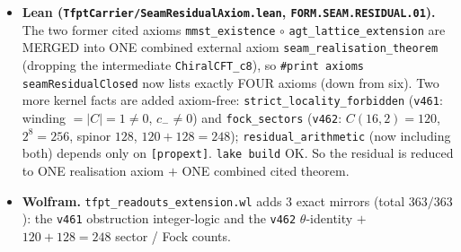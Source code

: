 \begin{itemize}
STATES FILL $120{\to}248$: $\chi_o$ gives $120$, $\chi_s$ gives $128$, summing to the exact tower
$\{1,248,4124,34752\}$ ($248{=}120{+}128$). \mE\ FINITE 16-MAJORANA FOCK: $C(16,2){=}120$ NS bilinear currents and
$2^{16/2}{=}256$ Ramond ground states $={}128$ spinor $+$ $128$ cospinor. \mE\ FINITE-$L\to$ CONTINUUM CONVERGENCE:
the critical free-fermion ring Casimir gives $c_-{\to}8$ and the lowest scaled NS gap $x_1{\to}1$ with
$|x_1{-}1|{\sim}1/L^2$ ($L{=}64..1024$). \mC\mO\ AGT/AMT (\texttt{v459}) supply the rigorous extension;
\texttt{SEAM.EQUIV.01} existence (\texttt{v336}) stays \mO. Mixed exact ($\theta$ identity $+$ tower $+$
$120/128/256$, Wolfram-mirrored) $+$ numerical (finite-$L$, Python-only).
\item \textbf{Lean (\texttt{TfptCarrier/SeamResidualAxiom.lean}, \texttt{FORM.SEAM.RESIDUAL.01}).} The two former
cited axioms \texttt{mmst\_existence} $\circ$ \texttt{agt\_lattice\_extension} are MERGED into ONE combined external
axiom \texttt{seam\_realisation\_theorem} (dropping the intermediate \texttt{ChiralCFT\_c8}), so
\texttt{\#print axioms seamResidualClosed} now lists exactly FOUR axioms (down from six). Two more kernel facts are
added axiom-free: \texttt{strict\_locality\_forbidden} (\texttt{v461}: winding $={}|C|{=}1{\neq}0$, $c_-{\neq}0$) and
\texttt{fock\_sectors} (\texttt{v462}: $C(16,2){=}120$, $2^8{=}256$, spinor $128$, $120{+}128{=}248$);
\texttt{residual\_arithmetic} (now including both) depends only on \texttt{[propext]}. \texttt{lake build} OK. So the
residual is reduced to ONE realisation axiom $+$ ONE combined cited theorem.
\item \textbf{Wolfram.} \texttt{tfpt\_readouts\_extension.wl} adds 3 exact mirrors (total $363/363$): the \texttt{v461}
obstruction integer-logic and the \texttt{v462} $\theta$-identity $+$ $120{+}128{=}248$ sector / Fock counts.
\end{itemize}


